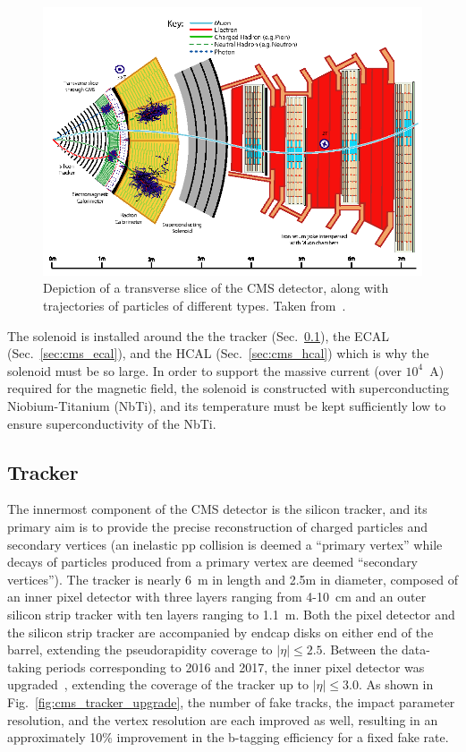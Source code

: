 \begin{figure} [htbp!]
    \centering
    \includegraphics[width=\linewidth]{figures/cms/cms_transverse_view.png}
    \caption{Depiction of a transverse slice of the CMS detector, along with trajectories of particles of different types. Taken from~\cite{Sirunyan:2270046}.}
    \label{fig:cms_transverse_view}
\end{figure}

The solenoid is installed around the the tracker (Sec.~\ref{sec:cms_tracker}), the ECAL (Sec.~\ref{sec:cms_ecal}), and the HCAL (Sec.~\ref{sec:cms_hcal}) which is why the solenoid must be so large.
In order to support the massive current (over $10^4$~A) required for the magnetic field, the solenoid is constructed with superconducting Niobium-Titanium (NbTi), and its temperature must be kept sufficiently low to ensure superconductivity of the NbTi. 

\subsection{Tracker} \label{sec:cms_tracker}
The innermost component of the CMS detector is the silicon tracker, and its primary aim is to provide the precise reconstruction of charged particles and secondary vertices (an inelastic pp collision is deemed a ``primary vertex'' while decays of particles produced from a primary vertex are deemed ``secondary vertices'').
The tracker is nearly 6~m in length and 2.5m in diameter, composed of an inner pixel detector with three layers ranging from 4-10~cm and an outer silicon strip tracker with ten layers ranging to 1.1~m.
Both the pixel detector and the silicon strip tracker are accompanied by endcap disks on either end of the barrel, extending the pseudorapidity coverage to $|\eta| \leq 2.5$.
Between the data-taking periods corresponding to 2016 and 2017, the inner pixel detector was upgraded~\cite{Botta:2285433}, extending the coverage of the tracker up to $|\eta| \leq 3.0$.
As shown in Fig.~\ref{fig:cms_tracker_upgrade}, the number of fake tracks, the impact parameter resolution, and the vertex resolution are each improved as well, resulting in an approximately 10\% improvement in the b-tagging efficiency for a fixed fake rate.

